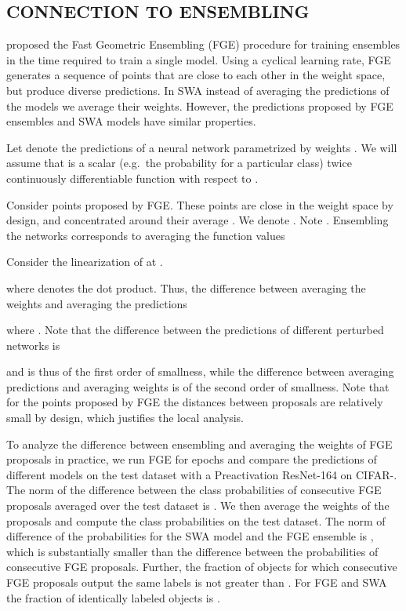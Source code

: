 \documentclass[letterpaper]{article}
\begin{document}
\subsection{CONNECTION TO ENSEMBLING}
\label{sec:ensembling}

\citet{garipov2018} proposed the Fast Geometric Ensembling (FGE) procedure 
for training ensembles in the time required to train a single model. Using a
cyclical learning rate, FGE generates a sequence of points
that are close to each other in the weight space, but produce diverse 
predictions. In SWA instead of averaging the predictions of the models we 
average their weights. However, the predictions proposed by FGE ensembles
and SWA models have similar properties. 

Let  denote the predictions of a neural network parametrized by
weights .
We will
assume that  is a scalar (e.g.\ the probability for a particular class)
twice continuously differentiable function with respect to . 

Consider points  proposed by FGE. These points are close in the weight space by 
design, and 
concentrated around their 
average . We denote
. Note .
Ensembling the networks corresponds to averaging
the function values

Consider the linearization of  at .

where  denotes the dot product.
Thus, the difference between averaging the weights and averaging the
predictions

where .
Note that the difference between the predictions of different perturbed networks
is

and is thus of the first order of smallness, while the difference between
averaging predictions and averaging weights is of the second order of
smallness. Note that for the points proposed by FGE the distances
between proposals are relatively small by design, which justifies 
the local analysis.

To analyze the difference between ensembling and averaging the weights of
FGE proposals in practice, we run FGE for  epochs and compare the
predictions of different models on the test dataset with a Preactivation
ResNet-164 \citep{he2016deep} on CIFAR-. The norm of the difference
between the class probabilities of consecutive FGE proposals averaged over 
the test 
dataset is . We then average the weights of the proposals and compute
the class probabilities on the test dataset. The norm of difference of the probabilities for
the SWA model and the FGE ensemble is , which is
substantially smaller than the difference between the probabilities of consecutive
FGE proposals. Further, the fraction of objects for which consecutive FGE proposals 
output the same labels is not greater than . For FGE and SWA
the fraction of identically labeled objects is .
\end{document}
